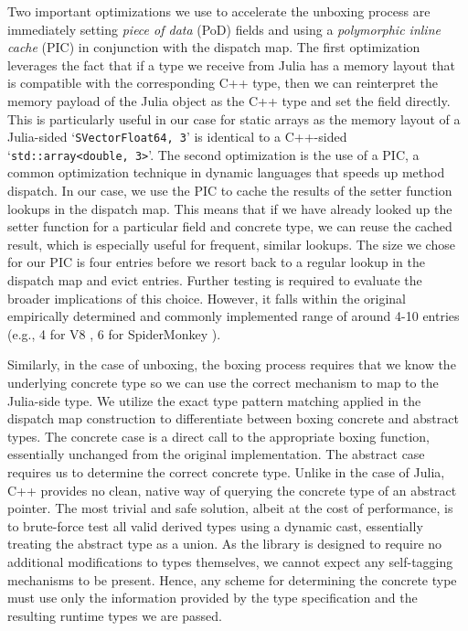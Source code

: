 Two important optimizations we use to accelerate the unboxing process are immediately setting \textit{piece of data} (PoD) fields and using a \textit{polymorphic inline cache} (PIC) in conjunction with the dispatch map. The first optimization leverages the fact that if a type we receive from Julia has a memory layout that is compatible with the corresponding C++ type, then we can reinterpret the memory payload of the Julia object as the C++ type and set the field directly. This is particularly useful in our case for static arrays as the memory layout of a Julia-sided `\texttt{SVector{Float64, 3}}' is identical to a C++-sided `\texttt{std::array<double, 3>}'. The second optimization is the use of a PIC, a common optimization technique in dynamic languages that speeds up method dispatch. In our case, we use the PIC to cache the results of the setter function lookups in the dispatch map. This means that if we have already looked up the setter function for a particular field and concrete type, we can reuse the cached result, which is especially useful for frequent, similar lookups. The size we chose for our PIC is four entries before we resort back to a regular lookup in the dispatch map and evict entries. Further testing is required to evaluate the broader implications of this choice. However, it falls within the original empirically determined \cite{HlzlePICs} and commonly implemented range of around 4-10 entries (e.g., 4 for V8 \cite{v8_wasm_constants}, 6 for SpiderMonkey \cite{mozilla_icstate}). 

Similarly, in the case of unboxing, the boxing process requires that we know the underlying concrete type so we can use the correct mechanism to map to the Julia-side type. We utilize the exact type pattern matching applied in the dispatch map construction to differentiate between boxing concrete and abstract types. The concrete case is a direct call to the appropriate boxing function, essentially unchanged from the original implementation. The abstract case requires us to determine the correct concrete type. Unlike in the case of Julia, C++ provides no clean, native way of querying the concrete type of an abstract pointer. The most trivial and safe solution, albeit at the cost of performance, is to brute-force test all valid derived types using a dynamic cast, essentially treating the abstract type as a union. As the library is designed to require no additional modifications to types themselves, we cannot expect any self-tagging mechanisms to be present. Hence, any scheme for determining the concrete type must use only the information provided by the type specification and the resulting runtime types we are passed. 

